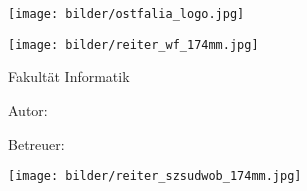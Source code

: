 \frontmatter
\begin{titlepage}
	\thispagestyle{titlepage}
	
	\hfill
	\texttt{[image: bilder/ostfalia\_logo.jpg]}
	
	\texttt{[image: bilder/reiter\_wf\_174mm.jpg]}
	
	\hspace{1cm}
	\begin{minipage}{\dimexpr\textwidth-1.5cm\relax}
		{\Large\textsf{Fakultät Informatik}}
	\end{minipage}
	
	\vfil
	
	\hspace{1cm}
	\begin{minipage}{\dimexpr\textwidth-1.5cm\relax}
		\hrulefill
		
		\vspace{2em}
		
		{\Large\textbf{\textsf{\documentsubject}}}
			
		\vspace{2em}
			
		{\Huge\textbf{\textsf{\documenttitle}}}
			
		\vspace{2em}
			
		{\Large\textsf{\documentsubtitle}}
		
		\vspace{1em}
		
		\hrulefill
	\end{minipage}	
	
	
	\vfil
	
	\hspace{1cm}
	\begin{minipage}{\dimexpr\textwidth-1.5cm\relax}
		{\Large\textsf{Autor: \documentauthor}}
		
		\vspace{0.5cm}		
		
		{\Large\textsf{Betreuer: \documenttutor}}
	\end{minipage}
	
	\vspace{2em}
	
	
	\enlargethispage{10\baselineskip}
	
	\texttt{[image: bilder/reiter\_szsudwob\_174mm.jpg]}
	
\end{titlepage}

\restoregeometry
